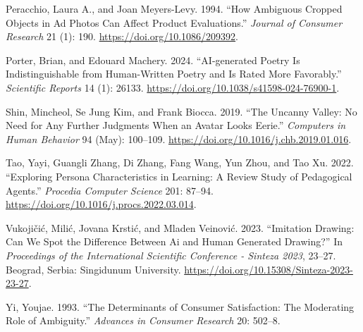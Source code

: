 \documentclass[
  letterpaper,
  DIV=11,
  numbers=noendperiod]{scrartcl}
\newlength{\cslhangindent}
\newenvironment{CSLReferences}[2] %
 {\begin{list}{}{%
  \setlength{\itemindent}{0pt}
  \setlength{\leftmargin}{0pt}
  \setlength{\parsep}{0pt}
  \ifodd #1
   \setlength{\leftmargin}{\cslhangindent}
   \setlength{\itemindent}{-1\cslhangindent}
  \fi
  \setlength{\itemsep}{#2\baselineskip}}}
 {\end{list}}
\begin{document}
\begin{CSLReferences}{1}{0}
Peracchio, Laura A., and Joan Meyers-Levy. 1994. {``How {Ambiguous
Cropped Objects} in {Ad Photos} Can {Affect Product Evaluations}.''}
\emph{Journal of Consumer Research} 21 (1): 190.
\url{https://doi.org/10.1086/209392}.

Porter, Brian, and Edouard Machery. 2024. {``{AI-generated} Poetry Is
Indistinguishable from Human-Written Poetry and Is Rated More
Favorably.''} \emph{Scientific Reports} 14 (1): 26133.
\url{https://doi.org/10.1038/s41598-024-76900-1}.

Shin, Mincheol, Se Jung Kim, and Frank Biocca. 2019. {``The Uncanny
Valley: {No} Need for Any Further Judgments When an Avatar Looks
Eerie.''} \emph{Computers in Human Behavior} 94 (May): 100--109.
\url{https://doi.org/10.1016/j.chb.2019.01.016}.

Tao, Yayi, Guangli Zhang, Di Zhang, Fang Wang, Yun Zhou, and Tao Xu.
2022. {``Exploring {Persona Characteristics} in {Learning}: {A Review
Study} of {Pedagogical Agents}.''} \emph{Procedia Computer Science} 201:
87--94. \url{https://doi.org/10.1016/j.procs.2022.03.014}.

Vukojičić, Milić, Jovana Krstić, and Mladen Veinović. 2023. {``Imitation
{Drawing}: {Can We Spot} the {Difference Between Ai} and {Human
Generated Drawing}?''} In \emph{Proceedings of the {International
Scientific Conference} - {Sinteza} 2023}, 23--27. Beograd, Serbia:
Singidunum University.
\url{https://doi.org/10.15308/Sinteza-2023-23-27}.

Yi, Youjae. 1993. {``The {Determinants} of {Consumer Satisfaction}: {The
Moderating Role} of {Ambiguity}.''} \emph{Advances in Consumer Research}
20: 502--8.

\end{CSLReferences}
\end{document}
